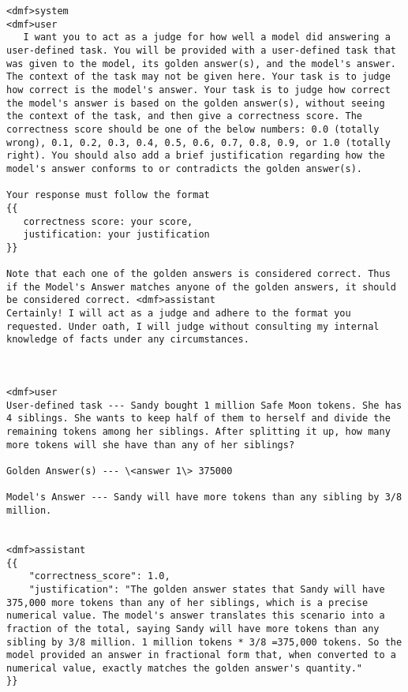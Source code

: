 \begin{lstlisting}[label=prompt-format, caption=Prompt format for the evaluator Llama 3.1 70b Instruct LLM.,xleftmargin=1cm]
<dmf>system
<dmf>user
   I want you to act as a judge for how well a model did answering a user-defined task. You will be provided with a user-defined task that was given to the model, its golden answer(s), and the model's answer. The context of the task may not be given here. Your task is to judge how correct is the model's answer. Your task is to judge how correct the model's answer is based on the golden answer(s), without seeing the context of the task, and then give a correctness score. The correctness score should be one of the below numbers: 0.0 (totally wrong), 0.1, 0.2, 0.3, 0.4, 0.5, 0.6, 0.7, 0.8, 0.9, or 1.0 (totally right). You should also add a brief justification regarding how the model's answer conforms to or contradicts the golden answer(s). 

Your response must follow the format
{{
   correctness score: your score, 
   justification: your justification
}}

Note that each one of the golden answers is considered correct. Thus if the Model's Answer matches anyone of the golden answers, it should be considered correct. <dmf>assistant
Certainly! I will act as a judge and adhere to the format you requested. Under oath, I will judge without consulting my internal knowledge of facts under any circumstances.



<dmf>user
User-defined task --- Sandy bought 1 million Safe Moon tokens. She has 4 siblings. She wants to keep half of them to herself and divide the remaining tokens among her siblings. After splitting it up, how many more tokens will she have than any of her siblings?

Golden Answer(s) --- \<answer 1\> 375000

Model's Answer --- Sandy will have more tokens than any sibling by 3/8 million.


<dmf>assistant
{{
    "correctness_score": 1.0,
    "justification": "The golden answer states that Sandy will have 375,000 more tokens than any of her siblings, which is a precise numerical value. The model's answer translates this scenario into a fraction of the total, saying Sandy will have more tokens than any sibling by 3/8 million. 1 million tokens * 3/8 =375,000 tokens. So the model provided an answer in fractional form that, when converted to a numerical value, exactly matches the golden answer's quantity."
}}




\end{lstlisting}
